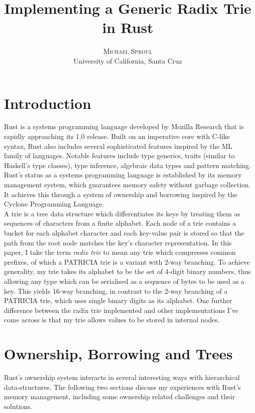 \documentclass[a4paper,12pt]{article}
\title{
Implementing a Generic Radix Trie in Rust
}
\author{
\textsc{Michael Sproul}\\
University of California, Santa Cruz
}
\date{}
\begin{document}
\maketitle

\section{Introduction}

Rust is a systems programming language developed by Mozilla Research that is rapidly approaching its 1.0 release. Built on an imperative core with C-like syntax, Rust also includes several sophisticated features inspired by the ML family of languages. Notable features include type generics, traits (similar to Haskell's type classes), type inference, algebraic data types and pattern matching.  Rust's status as a systems programming language is established by its memory management system, which guarantees memory safety without garbage collection. It achieves this through a system of ownership and borrowing inspired by the Cyclone Programming Language.\\

A trie is a tree data structure which differentiates its keys by treating them as sequences of characters from a finite alphabet. Each node of a trie contains a bucket for each alphabet character and each key-value pair is stored so that the path from the root node matches the key's character representation. In this paper, I take the term \textit{radix trie} to mean any trie which compresses common prefixes, of which a PATRICIA trie is a variant with 2-way branching. To achieve generality, my trie takes its alphabet to be the set of 4-digit binary numbers, thus allowing any type which can be serialised as a sequence of bytes to be used as a key. This yields 16-way branching, in contrast to the 2-way branching of a PATRICIA trie, which uses single binary digits as its alphabet. One further difference between the radix trie implemented and other implementations I've come across is that my trie allows values to be stored in internal nodes.

\section{Ownership, Borrowing and Trees}

Rust's ownership system interacts in several interesting ways with hierarchical data-structures. The following two sections discuss my experiences with Rust's memory management, including some ownership related challenges and their solutions.
\end{document}

